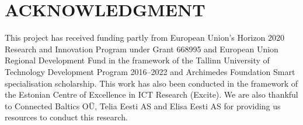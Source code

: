 \documentclass[conference,a4paper,xcolor=table]{IEEEtran}
\begin{document}
\section{ACKNOWLEDGMENT}\label{ack}
This project has received funding partly from European Union’s Horizon 2020 Research and Innovation Program under Grant 668995 and European Union Regional Development Fund in the framework of the Tallinn University of Technology Development Program 2016–2022 and Archimedes Foundation Smart specialisation scholarship. This work has also been conducted in the framework of the Estonian Centre of Excellence in ICT Research (Excite). We are also thankful to Connected Baltics OÜ, Telia Eesti AS and Elisa Eesti AS for providing us resources to conduct this research.




\end{document}
